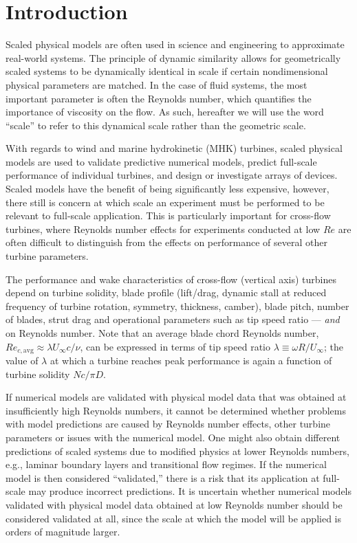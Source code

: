 \documentclass[energies,article,accept,moreauthors,pdftex,12pt,a4paper]{mdpi}
\begin{document}

\listoftodos

\section{Introduction}
Scaled physical models are often used in science and engineering to approximate 
real-world systems. The principle of dynamic similarity allows for
geometrically scaled systems to be dynamically identical in scale if certain
nondimensional physical parameters are matched. In the case of fluid systems,
the most important parameter is often the Reynolds number, which quantifies the
importance of viscosity on the flow. As such, hereafter we will use the word
``scale'' to refer to this dynamical scale rather than the geometric scale.

With regards to wind and marine hydrokinetic (MHK) turbines, scaled physical
models are used to validate predictive numerical models, predict full-scale
performance of individual turbines, and design or investigate arrays of devices.
Scaled models have the benefit of being significantly less expensive, however, 
there still is concern at which
scale an experiment must be performed to be relevant to full-scale application. 
This is particularly important for cross-flow turbines, where Reynolds number 
effects for experiments conducted at low $Re$ are often difficult to 
distinguish from the effects on performance of several other turbine 
parameters. 

The performance and wake characteristics of cross-flow (vertical 
axis) turbines depend on turbine solidity, blade profile (lift/drag, dynamic 
stall at reduced frequency of turbine rotation, symmetry, thickness, camber), 
blade pitch, number of blades, strut drag and operational parameters such as 
tip speed ratio --- {\em and} on Reynolds number. 
Note that an average blade chord Reynolds number, $Re_{c,\mathrm{avg}} \approx 
\lambda U_\infty c/ \nu$, can be expressed in terms of tip speed ratio $\lambda 
\equiv \omega R/ U_\infty$; the value of $\lambda$ at which a turbine reaches 
peak performance is again a function of turbine solidity $Nc/\pi D$.

If numerical models are validated with physical model data that
was obtained at insufficiently high Reynolds numbers, it cannot be determined
whether problems with model predictions are caused by Reynolds number effects, 
other turbine parameters or issues with the numerical model.
One might also obtain different predictions of scaled systems
due to modified physics at lower Reynolds numbers, e.g., laminar boundary 
layers and transitional flow regimes. If the numerical model is then considered
``validated,'' there is a risk that its application at full-scale may produce
incorrect predictions. It is uncertain whether numerical models validated with 
physical model data obtained at low Reynolds number should be considered 
validated at all, since the scale at which the model will be applied is orders 
of magnitude larger. 
\end{document}
